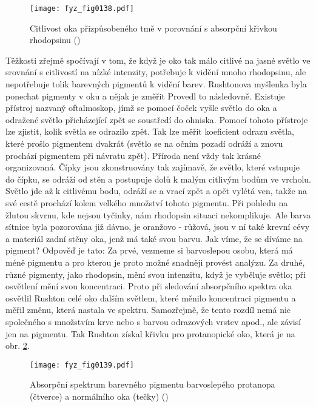     \begin{figure}[ht!]  %
      \centering
      \texttt{[image: fyz\_fig0138.pdf]}
      \caption{Citlivost oka přizpůsobeného tmě v porovnání s absorpční křivkou rhodopsinu
              (\cite[s.~478]{Feynman01})}
      \label{fyz:fig0138}
    \end{figure} 

    Těžkosti zřejmě spočívají v tom, že když je oko tak málo citlivé na jasné světlo ve srovnání s 
    citlivostí na nízké intenzity, potřebuje k vidění mnoho rhodopsinu, ale nepotřebuje tolik 
    barevných pigmentů k vidění barev. Rushtonova myšlenka byla ponechat pigmenty v oku a nějak je 
    změřit Provedl to následovně. Existuje přístroj nazvaný oftalmoskop, jímž se pomocí čoček vyšle 
    světlo do oka a odražené světlo přicházející zpět se soustředí do ohniska. Pomocí tohoto 
    přístroje lze zjistit, kolik světla se odrazilo zpět. Tak lze měřit koeficient odrazu světla, 
    které prošlo pigmentem dvakrát (světlo se na očním pozadí odráží a znovu prochází pigmentem 
    při návratu zpět). Příroda není vždy tak krásné organizovaná. Čípky jsou zkonstruovány tak 
    zajímavě, že světlo, které vstupuje do čípku, se odráží od stěn a postupuje dolů k malým 
    citlivým bodům ve vrcholu. Světlo jde až k citlivému bodu, odráží se a vrací zpět a opět vylétá 
    ven, takže na své cestě prochází kolem velkého množství tohoto pigmentu. Při pohledu na žlutou 
    skvrnu, kde nejsou tyčinky, nám rhodopsin situaci nekomplikuje. Ale barva sítnice byla 
    pozorována již dávno, je oranžovo - růžová, jsou v ní také krevní cévy a materiál zadní stěny 
    oka, jenž má také svou barvu. Jak víme, že se díváme na pigment? Odpověď je tato: Za prvé, 
    vezmeme si barvoslepou osobu, která má méně pigmentu a pro kterou je proto možné snadněji 
    provést analýzu. Za druhé, různé pigmenty, jako rhodopsin, mění svou intenzitu, když je 
    vyběluje světlo; při osvětlení mění svou koncentraci. Proto při sledování absorpčního spektra 
    oka osvětlil Rushton celé oko dalším světlem, které měnilo koncentraci pigmentu a měřil změnu, 
    která nastala ve spektru. Samozřejmě, že tento rozdíl nemá nic společného s množstvím krve nebo 
    s barvou odrazových vrstev apod., ale závisí jen na pigmentu. Tak Rushton získal křivku pro 
    protanopické oko, která je na obr. \ref{fyz:fig0139}.

    \begin{figure}[ht!]  %
      \centering
      \texttt{[image: fyz\_fig0139.pdf]}
      \caption{Absorpční spektrum barevného pigmentu barvoslepého protanopa (čtverce) a normálního 
               oka (tečky)
              (\cite[s.~479]{Feynman01})}
      \label{fyz:fig0139}
    \end{figure} 
    
